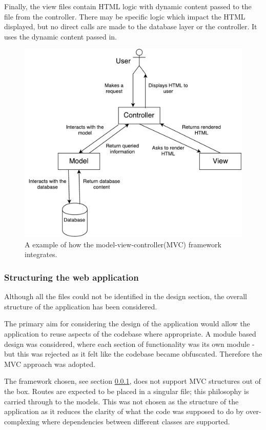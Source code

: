 Finally, the view files contain HTML logic with dynamic content passed to the file from the controller. There may be specific logic which impact the HTML displayed, but no direct calls are made to the database layer or the controller. It uses the dynamic content passed in.

\begin{figure}[H]
  \centering
  \includegraphics[scale=0.5]{images/MVC}
  \caption{A example of how the model-view-controller(MVC) framework integrates.}
  \label{fig:mvc}
\end{figure}

\subsubsection{Structuring the web application}
Although all the files could not be identified in the design section, the overall structure of the application has been considered.

The primary aim for considering the design of the application would allow the application to reuse aspects of the codebase where appropriate. A module based design was considered, where each section of functionality was its own module - but this was rejected as it felt like the codebase became obfuscated. Therefore the MVC approach was adopted.

The framework chosen, see section \ref{}, does not support MVC structures out of the box. Routes are expected to be placed in a singular file; this philosophy is carried through to the models. This was not chosen as the structure of the application as it reduces the clarity of what the code was supposed to do by over-complexing where dependencies between different classes are supported.

